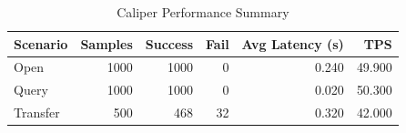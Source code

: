 \begin{table}
\caption{Caliper Performance Summary}
\label{tab:caliper_round}
\begin{tabular}{lrrrrr}
\toprule
Scenario & Samples & Success & Fail & Avg Latency (s) & TPS \\
\midrule
Open & 1000 & 1000 & 0 & 0.240 & 49.900 \\
Query & 1000 & 1000 & 0 & 0.020 & 50.300 \\
Transfer & 500 & 468 & 32 & 0.320 & 42.000 \\
\bottomrule
\end{tabular}
\end{table}
